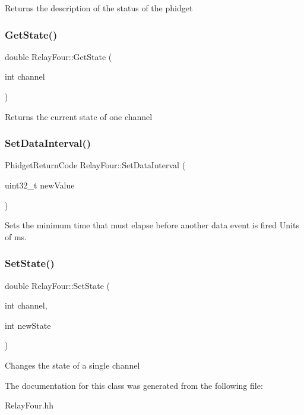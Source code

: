 Returns the description of the status of the phidget\mbox{\label{classRelayFour_a4bc7d85cf43949013dbe7e1272cd8fd5}} 
\subsubsection{\texorpdfstring{Get\+State()}{GetState()}}
{\footnotesize\ttfamily double Relay\+Four\+::\+Get\+State (\begin{DoxyParamCaption}\item[{int}]{channel }\end{DoxyParamCaption})\hspace{0.3cm}{\ttfamily [inline]}}

Returns the current state of one channel\mbox{\label{classRelayFour_a56d7fa541ee68cbcbeb83e36e115ead8}} 
\subsubsection{\texorpdfstring{Set\+Data\+Interval()}{SetDataInterval()}}
{\footnotesize\ttfamily Phidget\+Return\+Code Relay\+Four\+::\+Set\+Data\+Interval (\begin{DoxyParamCaption}\item[{uint32\+\_\+t}]{new\+Value }\end{DoxyParamCaption})\hspace{0.3cm}{\ttfamily [inline]}}

Sets the minimum time that must elapse before another data event is fired Units of ms.\mbox{\label{classRelayFour_a5590654655439dc0e12bd2d84d639bbe}} 
\subsubsection{\texorpdfstring{Set\+State()}{SetState()}}
{\footnotesize\ttfamily double Relay\+Four\+::\+Set\+State (\begin{DoxyParamCaption}\item[{int}]{channel,  }\item[{int}]{new\+State }\end{DoxyParamCaption})\hspace{0.3cm}{\ttfamily [inline]}}

Changes the state of a single channel

The documentation for this class was generated from the following file\+:\begin{DoxyCompactItemize}
\item 
Relay\+Four.\+hh\end{DoxyCompactItemize}
